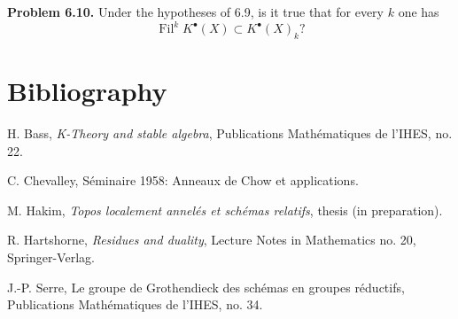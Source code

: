 \documentclass[11pt]{article}
\newcommand{\Fil}{\operatorname{Fil}}
\begin{document}
\textbf{Problem 6.10.} Under the hypotheses of 6.9, is it true that for every \(k\) one has
\[
  \Fil^kK^\bullet(X)\subset K^\bullet(X)_k?
\]

\section*{Bibliography}
\begin{enumerate}[label={[\arabic*]}]
\item H. Bass, \emph{K-Theory and stable algebra}, Publications Mathématiques de l'IHES, no. 22.
\item C. Chevalley, Séminaire 1958: Anneaux de Chow et applications.
\item M. Hakim, \emph{Topos localement annelés et schémas relatifs}, thesis (in preparation).
\item R. Hartshorne, \emph{Residues and duality}, Lecture Notes in Mathematics no. 20, Springer-Verlag.
\item J.-P. Serre, Le groupe de Grothendieck des schémas en groupes réductifs, Publications Mathématiques de l'IHES, no. 34.
\end{enumerate}
\end{document}

